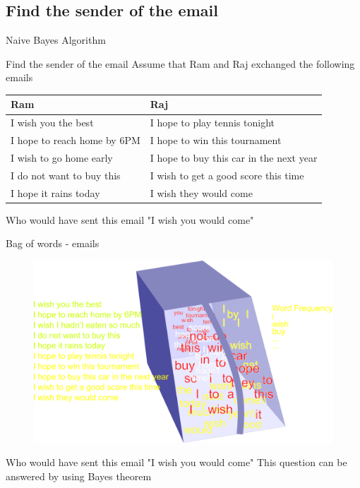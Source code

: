 \subsection{Find the sender of the email}

\begin{frame}{}
\LARGE Naive Bayes Algorithm
\end{frame}


\begin{frame}{Find the sender of the email}
Assume that Ram and Raj exchanged the following emails
\begin{table}
\begin{tabular}{|l|l|}
	\hline
	Ram&Raj\\
	\hline
	I wish you the best&I hope to play tennis tonight\\
	I hope to reach home by 6PM&I hope to win this tournament\\
	I wish to go home early&I hope to buy this car in the next year\\
	I do not want to buy this &I wish to get a good score this time\\
	I hope it rains today&I wish they would come\\
	\hline
\end{tabular}
\end{table}
\vspace{0.3mm}
Who would have sent this email "I wish you would come"
\end{frame}


\begin{frame}{Bag of words - emails }
\begin{figure}
	\centering
	\includegraphics[width=0.8\linewidth]{./Images/BagOfWords}
	\label{fig:bagofwords}
\end{figure}
	Who would have sent this email "I wish you would come"
	\vspace{0.3mm}
	This question can be answered by using Bayes theorem
\end{frame}


